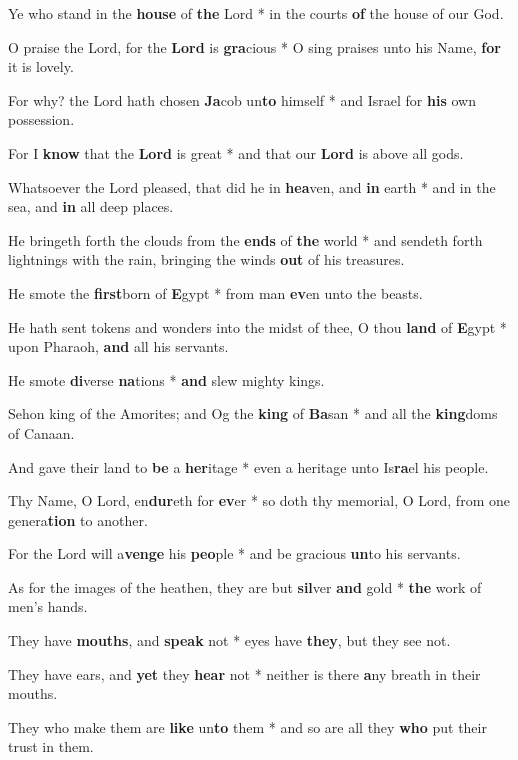 \begin{multicols}{2}
	Ye who stand in the \textbf{house} of \textbf{the} Lord * in the courts \textbf{of} the house of our God.
	
	O praise the Lord, for the \textbf{Lord} is \textbf{gra}cious * O sing praises unto his Name, \textbf{for} it is lovely.
	
	For why? the Lord hath chosen \textbf{Ja}cob un\textbf{to} himself * and Israel for \textbf{his} own possession.
	
	For I \textbf{know} that the \textbf{Lord} is great * and that our \textbf{Lord} is above all gods.
	
	Whatsoever the Lord pleased, that did he in \textbf{hea}ven, and \textbf{in} earth * and in the sea, and \textbf{in} all deep places.
	
	He bringeth forth the clouds from the \textbf{ends} of \textbf{the} world * and sendeth forth lightnings with the rain, bringing the winds \textbf{out} of his treasures.
	
	He smote the \textbf{first}born of \textbf{E}gypt * from man \textbf{ev}en unto the beasts.
	
	He hath sent tokens and wonders into the midst of thee, O thou \textbf{land} of \textbf{E}gypt * upon Pharaoh, \textbf{and} all his servants.
	
	He smote \textbf{di}verse \textbf{na}tions * \textbf{and} slew mighty kings.
	
	Sehon king of the Amorites; and Og the \textbf{king} of \textbf{Ba}san * and all the \textbf{king}doms of Canaan.
	
	And gave their land to \textbf{be} a \textbf{her}itage * even a heritage unto Is\textbf{ra}el his people.
	
	Thy Name, O Lord, en\textbf{dur}eth for \textbf{ev}er * so doth thy memorial, O Lord, from one genera\textbf{tion} to another.
	
	For the Lord will a\textbf{venge} his \textbf{peo}ple * and be gracious \textbf{un}to his servants.
	
	As for the images of the heathen, they are but \textbf{sil}ver \textbf{and} gold * \textbf{the} work of men's hands.
	
	They have \textbf{mouths}, and \textbf{speak} not * eyes have \textbf{they}, but they see not.
	
	They have ears, and \textbf{yet} they \textbf{hear} not * neither is there \textbf{a}ny breath in their mouths.
	
	They who make them are \textbf{like} un\textbf{to} them * and so are all they \textbf{who} put their trust in them.
	

\end{multicols}
